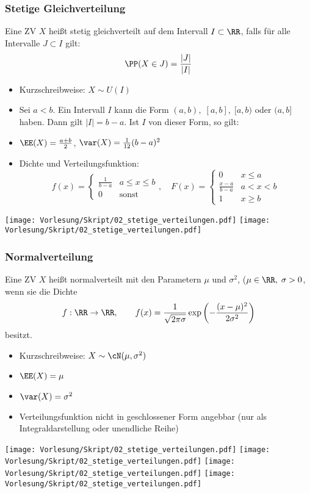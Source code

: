 \documentclass{scrreprt}
\begin{document}
\subsubsection{Stetige Gleichverteilung}
 Eine ZV $X$ heißt stetig gleichverteilt auf dem Intervall $I\subset \RR$, falls für alle Intervalle $J \subset I$ gilt:
$$\PP(X\in J)=\frac{|J|}{|I|}$$
\begin{itemize}
\item Kurzschreibweise: $X \sim U(I)$
\item Sei $a<b$. Ein Intervall $I$ kann die Form $(a,b),\;[a,b],\;[a,b)$ oder $(a,b]$ haben. Dann gilt $|I|=b-a$. Ist $I$ von dieser Form, so gilt:
\item $\EE(X)=\frac{a+b}{2}$, $\var(X)=\frac{1}{12}(b-a)^2$
\item Dichte und Verteilungsfunktion:
$$f(x)=\begin{cases}
\frac{1}{b-a} & a\leq x \leq b\\
0 & \mathrm{sonst}
\end{cases}, \quad F(x)=\begin{cases}
0 & x \leq a\\
\frac{x-a}{b-a} & a<x<b\\
1 & x \geq b
\end{cases}$$
\end{itemize}
\begin{center}
\texttt{[image: Vorlesung/Skript/02\_stetige\_verteilungen.pdf]}
\texttt{[image: Vorlesung/Skript/02\_stetige\_verteilungen.pdf]}
\end{center}
\subsubsection{Normalverteilung}
 Eine ZV $X$ heißt normalverteilt mit den Parametern $\mu$ und $\sigma^2$, ($\mu \in \RR, \; \sigma > 0$, wenn sie die Dichte
$$f: \RR\to \RR, \qquad f(x)=\frac{1}{\sqrt{2\pi\sigma}}\exp\left(-\frac{(x-\mu)^2}{2\sigma^2}\right)$$
besitzt.

\begin{itemize}
\item Kurzschreibweise: $X\sim \cN(\mu, \sigma^2)$
\item $\EE(X)=\mu$
\item $\var(X) = \sigma^2$
\item Verteilungsfunktion nicht in geschlossener Form angebbar (nur als Integraldarstellung oder unendliche Reihe)
\end{itemize}
\begin{center}
\texttt{[image: Vorlesung/Skript/02\_stetige\_verteilungen.pdf]}
\texttt{[image: Vorlesung/Skript/02\_stetige\_verteilungen.pdf]}
\texttt{[image: Vorlesung/Skript/02\_stetige\_verteilungen.pdf]}
\texttt{[image: Vorlesung/Skript/02\_stetige\_verteilungen.pdf]}
\end{center}
\end{document}
